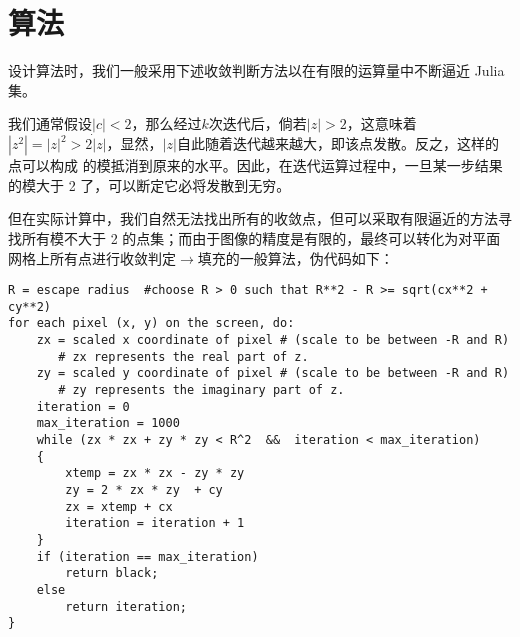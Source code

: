 \section{算法}

设计算法时，我们一般采用下述收敛判断方法以在有限的运算量中不断逼近 Julia 集。

我们通常假设$|c|<2$，那么经过$k$次迭代后，倘若$|z|>2$，这意味着
$|z^2|=|z|^2>2\dot|z|$，显然，$|z|$自此随着迭代越来越大，即该点发散。反之，这样的点可以构成
的模抵消到原来的水平。因此，在迭代运算过程中，一旦某一步结果的模大于 2 了，可以断定它必将发散到无穷。\textsuperscript{\cite{website-julia-mandelbrot}}

但在实际计算中，我们自然无法找出所有的收敛点，但可以采取有限逼近的方法寻找所有模不大于 2 的点集；而由于图像的精度是有限的，最终可以转化为对平面网格上所有点进行收敛判定$\rightarrow$填充的一般算法，伪代码如下：

\begin{verbatim}
R = escape radius  #choose R > 0 such that R**2 - R >= sqrt(cx**2 + cy**2)
for each pixel (x, y) on the screen, do:
    zx = scaled x coordinate of pixel # (scale to be between -R and R)
       # zx represents the real part of z.
    zy = scaled y coordinate of pixel # (scale to be between -R and R)
       # zy represents the imaginary part of z.
    iteration = 0
    max_iteration = 1000
    while (zx * zx + zy * zy < R^2  &&  iteration < max_iteration) 
    {
        xtemp = zx * zx - zy * zy
        zy = 2 * zx * zy  + cy 
        zx = xtemp + cx
        iteration = iteration + 1 
    }
    if (iteration == max_iteration)
        return black;
    else
        return iteration;
}
\end{verbatim}